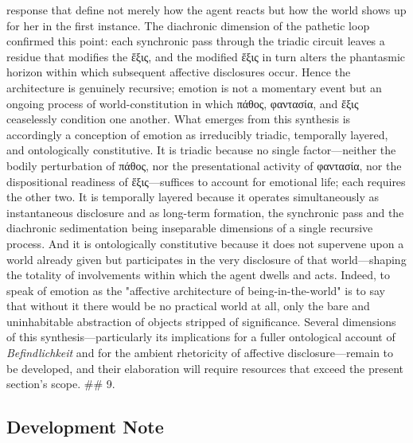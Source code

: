 \documentclass{article}
\begin{document}
response that define not merely how the agent reacts but how the world shows up for her in the first instance. The diachronic dimension of the pathetic loop confirmed this point: each synchronic pass through the triadic circuit leaves a residue that modifies the ἕξις, and the modified ἕξις in turn alters the phantasmic horizon within which subsequent affective disclosures occur. Hence the architecture is genuinely recursive; emotion is not a momentary event but an ongoing process of world-constitution in which πάθος, φαντασία, and ἕξις ceaselessly condition one another. What emerges from this synthesis is accordingly a conception of emotion as irreducibly triadic, temporally layered, and ontologically constitutive. It is triadic because no single factor—neither the bodily perturbation of πάθος, nor the presentational activity of φαντασία, nor the dispositional readiness of ἕξις—suffices to account for emotional life; each requires the other two. It is temporally layered because it operates simultaneously as instantaneous disclosure and as long-term formation, the synchronic pass and the diachronic sedimentation being inseparable dimensions of a single recursive process. And it is ontologically constitutive because it does not supervene upon a world already given but participates in the very disclosure of that world—shaping the totality of involvements within which the agent dwells and acts. Indeed, to speak of emotion as the "affective architecture of being-in-the-world" is to say that without it there would be no practical world at all, only the bare and uninhabitable abstraction of objects stripped of significance. Several dimensions of this synthesis—particularly its implications for a fuller ontological account of \textit{Befindlichkeit} and for the ambient rhetoricity of affective disclosure—remain to be developed, and their elaboration will require resources that exceed the present section's scope. ## 9. 

\subsection*{Development Note}
\end{document}
